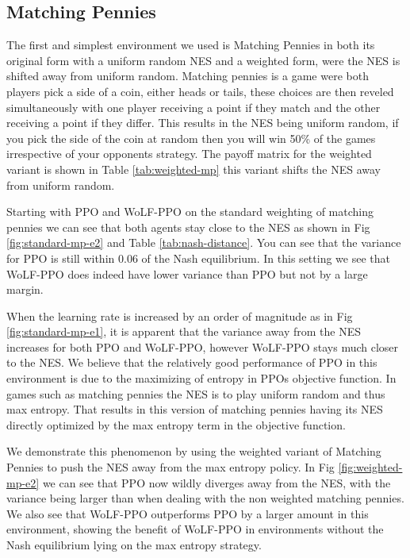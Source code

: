\documentclass[conference]{IEEEtran}
\begin{document}
\subsection{Matching Pennies}

The first and simplest environment we used is Matching Pennies in both its original form with a uniform random NES and a weighted form, were the NES is shifted away from uniform random. Matching pennies is a game were both players pick a side of a coin, either heads or tails, these choices are then reveled simultaneously with one player receiving a point if they match and the other receiving a point if they differ. This results in the NES being uniform random, if you pick the side of the coin at random then you will win 50\% of the games irrespective of your opponents strategy. The payoff matrix for the weighted variant is shown in Table \ref{tab:weighted-mp} this variant shifts the NES away from uniform random.

Starting with PPO and WoLF-PPO on the standard weighting of matching pennies we can see that both agents stay close to the NES as shown in Fig \ref{fig:standard-mp-e2} and Table \ref{tab:nash-distance}. You can see that the variance for PPO is still within $0.06$ of the Nash equilibrium. In this setting we see that WoLF-PPO does indeed have lower variance than PPO but not by a large margin.

When the learning rate is increased by an order of magnitude as in Fig \ref{fig:standard-mp-e1}, it is apparent that the variance away from the NES increases for both PPO and WoLF-PPO, however WoLF-PPO stays much closer to the NES. We believe that the relatively good performance of PPO in this environment is due to the maximizing of entropy in PPOs objective function. In games such as matching pennies the NES is to play uniform random and thus max entropy. That results in this version of matching pennies having its NES directly optimized by the max entropy term in the objective function.

We demonstrate this phenomenon by using the weighted variant of Matching Pennies to push the NES away from the max entropy policy. In Fig \ref{fig:weighted-mp-e2} we can see that PPO now wildly diverges away from the NES, with the variance being larger than when dealing with the non weighted matching pennies. We also see that WoLF-PPO outperforms PPO by a larger amount in this environment, showing the benefit of WoLF-PPO in environments without the Nash equilibrium lying on the max entropy strategy.
\end{document}
